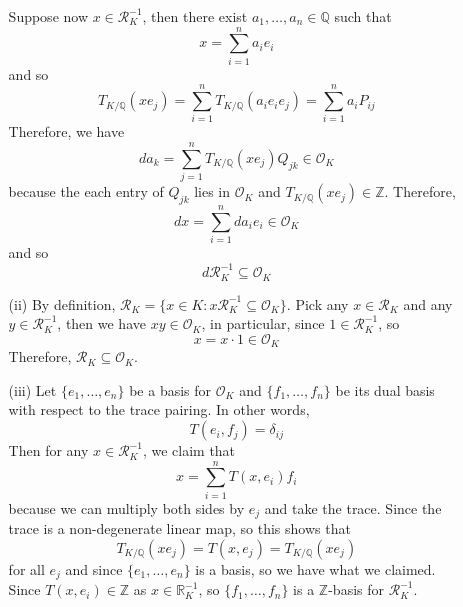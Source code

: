 \begin{enumerate}
\begin{enumerate}
    Suppose now $x \in \mathcal{R}^{-1}_K$, then there exist $a_1,\ldots,a_n \in \mathbb{Q}$ such that
    $$x=\sum_{i=1}^n a_i e_i$$
    and so
    $$T_{K/\mathbb{Q}}(x e_j)=\sum_{i=1}^n T_{K/\mathbb{Q}}(a_i e_i e_j)=\sum_{i=1}^n a_i P_{ij}$$
    Therefore, we have
    $$da_k=\sum_{j=1}^n T_{K/\mathbb{Q}}(xe_j)Q_{jk} \in \mathcal{O}_K$$
    because the each entry of $Q_{jk}$ lies in $\mathcal{O}_K$ and $T_{K/\mathbb{Q}}(xe_j) \in \mathbb{Z}$.
    Therefore,
    $$dx=\sum_{i=1}^n da_ie_i \in \mathcal{O}_K$$
    and so
    $$d \mathcal{R}^{-1}_K \subseteq \mathcal{O}_K$$
\item[(ii)] By definition, $\mathcal{R}_K=\{x \in K: x\mathcal{R}^{-1}_K \subseteq \mathcal{O}_K\}$.
    Pick any $x \in \mathcal{R}_K$ and any $y \in \mathcal{R}^{-1}_K$, then we have
    $xy \in \mathcal{O}_K$, in particular, since $1 \in \mathcal{R}^{-1}_K$, so
    $$x=x \cdot 1 \in \mathcal{O}_K$$
    Therefore, $\mathcal{R}_K \subseteq \mathcal{O}_K$.
\item[(iii)] Let $\{e_1,\ldots,e_n\}$ be a basis for $\mathcal{O}_K$ and $\{f_1,\ldots,f_n\}$ be its dual basis with respect to the trace pairing. In other words,
    $$T(e_i,f_j)=\delta_{ij}$$
    Then for any $x \in \mathcal{R}^{-1}_K$, we claim that
    $$x=\sum_{i=1}^n T(x,e_i)f_i$$
    because we can multiply both sides by $e_j$ and take the trace. Since the trace is a non-degenerate
    linear map, so this shows that
    $$T_{K/\mathbb{Q}}(xe_j)=T(x,e_j)=T_{K/\mathbb{Q}}(xe_j)$$ for all $e_j$ and since $\{e_1,\ldots,e_n\}$ is a
    basis, so we have what we claimed.
    Since $T(x,e_i) \in \mathbb{Z}$ as $x \in \mathbb{R}^{-1}_K$, so $\{f_1,\ldots,f_n\}$ is a $\mathbb{Z}$-basis
    for $\mathcal{R}^{-1}_K$.


\end{enumerate}
\end{enumerate}
